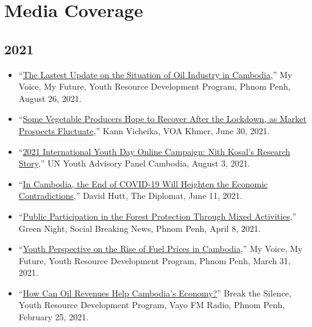 \documentclass[10pt,a4paper]{article}
\begin{document}
\section*{Media Coverage}	
	\begin{adjustwidth}{.7cm}{}
		
	\subsection*{2021}
	\begin{itemize}[label={},itemindent=-2em,leftmargin=2em]
		\item ``\href{https://www.facebook.com/yrdpcambodiapage/videos/911465489439190}{The Lastest Update on the Situation of Oil Industry in Cambodia},'' My Voice, My Future, Youth Resource Development Program, Phnom Penh, August 26, 2021. 
			
		\item ``\href{https://khmer.voanews.com/a/despite-unstable-market-some-vegetable-farmers-become-hopeful-for-full-recovery-without-covid-lockdown/5948160.html}{Some Vegetable Producers Hope to Recover After the Lockdown, as Market Prospects Fluctuate},'' Kann Vicheika, VOA Khmer, June 30, 2021. 
		
		\item ``\href{https://www.facebook.com/UNYAPCambodia/photos/a.1778939605680848/2997309793843817/}{2021 International Youth Day Online Campaign: Nith Kosal's Research Story},'' UN Youth Advisory Panel Cambodia, August 3, 2021. 
		
		\item ``\href{https://thediplomat.com/2021/06/in-cambodia-the-end-of-covid-19-will-heighten-the-economic-contradictions/}{In Cambodia, the End of COVID-19 Will Heighten the Economic Contradictions},'' David Hutt, The Diplomat, June 11, 2021.
		
		\item “\href{https://www.facebook.com/SBNKHMER/videos/134854181929606}{Public Participation in the Forest Protection Through Mixed Activities},” Green Night, Social Breaking News, Phnom Penh, April 8, 2021.
				
		\item ``\href{https://www.facebook.com/yrdpcambodiapage/videos/2881489105503837}{Youth Perspective on the Rise of Fuel Prices in Cambodia},” My Voice, My Future, Youth Resource Development Program, Phnom Penh, March 31, 2021.
				
		\item ``\href{https://www.facebook.com/yrdpcambodiapage/videos/128663862414486}{How Can Oil Revenues Help Cambodia's Economy?}” Break the Silence, Youth Resource Development Program, Vayo FM Radio, Phnom Penh, February 25, 2021.
			

\end{itemize}
\end{adjustwidth}
\end{document}
